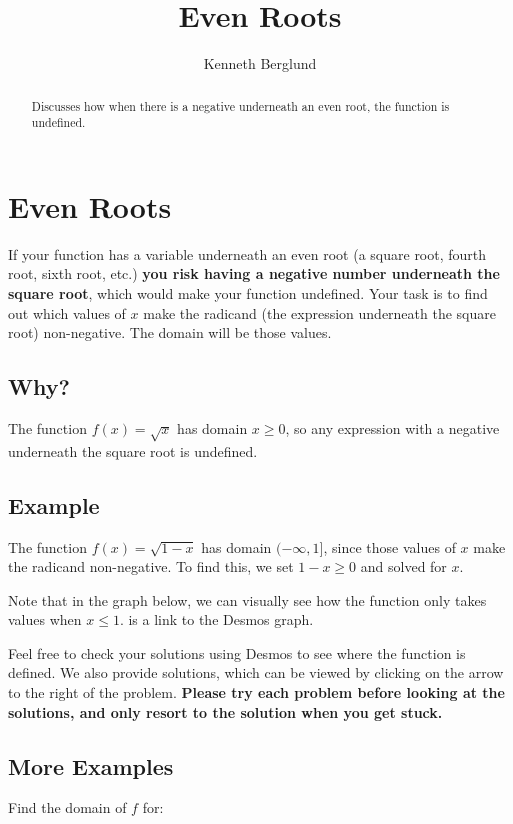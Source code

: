 \documentclass{ximera}
\title{Even Roots}
\author{Kenneth Berglund}
\begin{document}
\begin{abstract}
Discusses how when there is a negative underneath an even root, the function is undefined. 
\end{abstract}
\maketitle

\section{Even Roots}
If your function has a variable underneath an even root (a square root, fourth root, sixth root, etc.) \textbf{you risk having a negative number underneath the square root}, which would make your function undefined. Your task is to find out which values of $x$ make the radicand (the expression underneath the square root) non-negative. The domain will be those values.

\subsection{Why?}
The function $f(x) = \sqrt{x}$ has domain $x \ge 0$, so any expression with a negative underneath the square root is undefined. 

\subsection{Example}
The function $f(x) = \sqrt{1 - x}$ has domain $(-\infty, 1]$, since those values of $x$ make the radicand non-negative. To find this, we set $1 - x \ge 0$ and solved for $x$. 

Note that in the graph below, we can visually see how the function only takes values when $x \le 1$.  is a link to the Desmos graph. 
\begin{center}
\end{center}

Feel free to check your solutions using Desmos to see where the function is defined. We also provide solutions, which can be viewed by clicking on the arrow to the right of the problem. \textbf{Please try each problem before looking at the solutions, and only resort to the solution when you get stuck.} 

\subsection{More Examples}
Find the domain of $f$ for:
\end{document}
